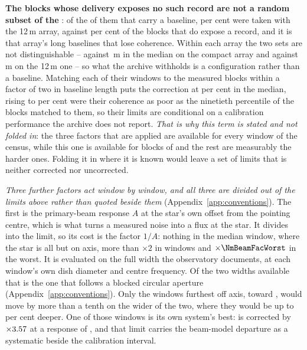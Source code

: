 \textbf{The \RpDecNUn{} blocks whose delivery exposes no such record are not
a random subset of the \SensDecorNBlkTot}: of the \NbDecNUnBl{} of them that
carry a baseline, \NbDecPctTwelveUn{} per cent were taken with the 12\,m
array, against \NbDecPctTwelveMeas{} per cent of the blocks that do expose a
record, and it is that array's long baselines that lose coherence.
Within each array the two sets are not distinguishable --
\NbDecBlSevenUn{} against \NbDecBlSevenMeas\,m in the median on the compact
array and \NbDecBlTwelveUn{} against \NbDecBlTwelveMeas\,m on the 12\,m one
-- so what the archive withholds is a configuration rather than a baseline.
Matching each of their windows
to the measured blocks within a factor of two in baseline length puts the
correction at \RpDecMatchMed{} per cent in the median, rising to
\RpDecMatchHi{} per cent were their coherence as poor as the ninetieth
percentile of the blocks matched to them, so their limits are conditional on
a calibration performance the archive does not report. \emph{That is why this
term is stated and not folded in}: the three factors that are applied are
available for every window of the census, while this one is available for
\SensDecorNBlk{} blocks of \SensDecorNBlkTot{} and the rest are measurably
the harder ones. Folding it in where it is known would leave a set of limits
that is neither corrected nor uncorrected.

\emph{Three further factors act window by window, and all three are divided
out of the limits above rather than quoted beside them}
(Appendix~\ref{app:conventions}). The first is the primary-beam response
$A$ at the star's own offset from the pointing centre, which is what turns a
measured noise into a flux at the star. It divides into the limit, so its
cost is the factor $1/A$: nothing in the median window, where the star is all
but on axis, more than $\times2$ in \NmBeamNFacTwo{} windows and
$\times\NmBeamFacWorst$ in the worst. It is evaluated on the full width the
observatory documents, at each window's own dish diameter and centre
frequency. Of the two widths available that is the one that follows a blocked
circular aperture (Appendix~\ref{app:conventions}). Only the
\BmNAboveTenPct{} windows furthest off axis, toward \BnStarList, would move
by more than a tenth on the wider of the two, where they would be up to
\BmShiftMaxPct{} per cent deeper. One of those windows is its own system's
best: \BnBestSys{} is corrected by $\times3.57$ at a response of
\BnBestResp, and that limit carries the beam-model departure as a
systematic beside the calibration interval.

